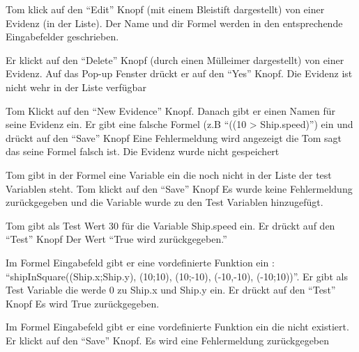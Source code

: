 \documentclass[parskip=full,11pt,twoside]{scrartcl}
\begin{document}
{Tom klick auf den \enquote{Edit} Knopf (mit einem Bleistift dargestellt) von einer Evidenz (in der Liste).}
{Der Name und dir Formel werden in den entsprechende Eingabefelder geschrieben.}

{Er klickt auf den \enquote{Delete} Knopf (durch einen Mülleimer dargestellt) von einer Evidenz. Auf das Pop-up Fenster drückt er auf den
\enquote{Yes} Knopf.}
{Die Evidenz ist nicht wehr in der Liste verfügbar}


{Tom Klickt auf den \enquote{New Evidence} Knopf. Danach gibt er einen Namen für seine Evidenz ein.
Er gibt eine falsche Formel (z.B \enquote{((10 > Ship.speed)}) ein und drückt auf den \enquote{Save} Knopf}
{Eine Fehlermeldung wird angezeigt die Tom sagt das seine Formel falsch ist. Die Evidenz wurde nicht gespeichert}

{Tom gibt in der Formel eine Variable ein die noch nicht in der Liste der test Variablen steht. Tom klickt
auf den \enquote{Save} Knopf }
{Es wurde keine Fehlermeldung zurückgegeben und die Variable wurde zu den Test Variablen hinzugefügt.}

{Tom gibt als Test Wert 30 für die Variable Ship.speed ein. Er drückt auf den \enquote{Test} Knopf}
{Der Wert \enquote{True wird zurückgegeben.}}

{Im Formel Eingabefeld gibt er eine vordefinierte Funktion ein : \enquote{shipInSquare((Ship.x;Ship.y), (10;10), (10;-10), (-10,-10), (-10;10))}.
Er gibt als Test Variable die werde 0 zu Ship.x und Ship.y ein. Er drückt auf den \enquote{Test} Knopf}
{Es wird True zurückgegeben.}

{Im Formel Eingabefeld gibt er eine vordefinierte Funktion ein die nicht existiert. Er klickt auf den \enquote{Save} Knopf.}
{Es wird eine Fehlermeldung zurückgegeben}
\end{document}
